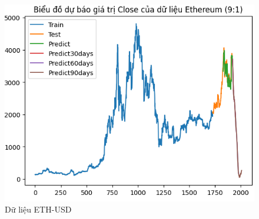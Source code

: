 \documentclass[conference]{IEEEtran}
\begin{document}
\begin{figure}[H]
\begin{minipage}{0.15\textwidth}
			\includegraphics[width=1\textwidth]{Figure/ETH91.png}
		\end{minipage}
		\caption{Dữ liệu ETH-USD}
		\label{fig:1}
	\end{figure}
\end{document}

